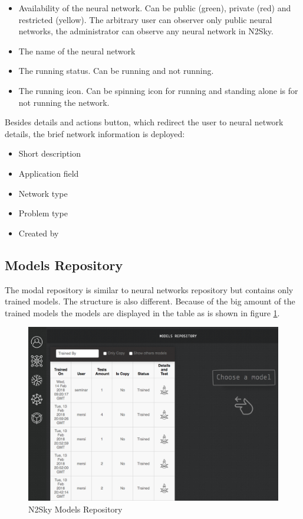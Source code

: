 \begin{enumerate}
\begin{itemize}
\item Availability of the neural network. Can be public (green), private (red) and restricted (yellow). The arbitrary user can observer only public neural networks, the administrator can observe any neural network in N2Sky.  

\item The name of the neural network
\item The running status. Can be running and not running.
\item The running icon. Can be spinning icon for running and standing alone is for not running the network.
\end{itemize}

Besides details and actions button, which redirect the user to neural network details, the brief network information is deployed:
\begin{itemize}
\item Short description
\item Application field
\item Network type
\item Problem type
\item Created by
\end{itemize}

\end{enumerate}

\subsection{Models Repository}\label{Models Repository}

The modal repository is similar to neural networks repository but contains only trained models. The structure is also different. Because of the big amount of the trained models the models are displayed in the table as is shown in figure \ref{fig:model_repo}. 

\begin{figure}[H]
\begin{center}
  \includegraphics[width=\linewidth]{components/5/img/model_repo.png}
  \caption{N2Sky Models Repository}
  \label{fig:model_repo}
\end{center}
\end{figure}

